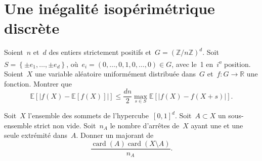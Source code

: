 \section{Une inégalité isopérimétrique discrète}

Soient~$n$ et~$d$ des entiers strictement positifs et~$G = \left( \mathbb{Z}/n \mathbb{Z} \right)^d$.
Soit~$S = \left\{ \pm e_1,\dotsc,\pm e_d \right\}$, où~$e_i = (0,\dotsc,0,1,0,\dotsc,0) \in G$, avec le~1 en~$i$\textsuperscript{e} position.
Soient~$X$ une variable aléatoire uniformément distribuée dans~$G$ et~$f : G\to \mathbb{R}$ une fonction.
Montrer que
\[ \mathbb{E} \left[ \left| f(X) - \mathbb{E}[f(X)] \right| \right] \leq \frac{dn}{2} \max_{s\in S} \mathbb{E} \left[ |f(X) - f(X + s)| \right]. \]

Soit~$X$ l'ensemble des sommets de l'hypercube~$[0,1]^d$.
Soit~$A \subset X$ un sous-ensemble strict non vide.
Soit~$n_A$ le nombre d'arrêtes de~$X$ ayant une et une seule extrémité dans~$A$.
Donner un majorant de
\[ \frac{\operatorname{card}(A) \operatorname{card}(X\setminus A)}{n_A}. \]


